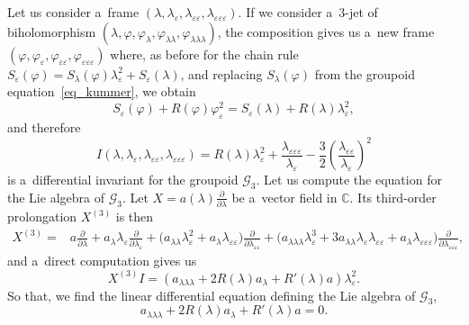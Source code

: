 \documentclass[pdftex]{sigma}
\numberwithin{equation}{section}
\theoremstyle{definition}
\begin{document}
Let us consider a~frame $(\lambda,\lambda_\varepsilon,\lambda_{\varepsilon\varepsilon},\lambda_{\varepsilon\varepsilon\varepsilon})$. If we consider a~$3$-jet of biholomorphism $(\lambda,\varphi,\varphi_\lambda,\allowbreak \varphi_{\lambda\lambda},\varphi_{\lambda\lambda\lambda})$, the composition gives us a~new frame $(\varphi,\varphi_\varepsilon,\varphi_{\varepsilon\varepsilon},\varphi_{\varepsilon\varepsilon\varepsilon})$ where, as before for the chain rule
$
S_{\varepsilon}(\varphi) = S_{\lambda}(\varphi) \lambda_{\varepsilon}^2 + S_\varepsilon(\lambda)$,
and replacing $S_{\lambda}(\varphi)$ from the groupoid equation~\eqref{eq_kummer}, we obtain
\[
S_{\varepsilon}(\varphi) + R(\varphi)\varphi_\varepsilon^2 = S_{\varepsilon}(\lambda) + R(\lambda)\lambda_\varepsilon^2,
\]
and therefore
\begin{equation}\label{eq_invariant}
I(\lambda,\lambda_{\varepsilon},\lambda_{\varepsilon\varepsilon},\lambda_{\varepsilon\varepsilon\varepsilon}) = R(\lambda)\lambda_\varepsilon^2 + \frac{\lambda_{\varepsilon\varepsilon\varepsilon}}{\lambda_\varepsilon} - \frac{3}{2}
\left(\frac{\lambda_{\varepsilon\varepsilon}}{\lambda_\varepsilon}\right)^2
\end{equation}
is a~differential invariant for the groupoid $\mathcal G_3$. Let us compute the equation for the Lie algebra of $\mathcal G_3$. Let $X = a(\lambda)\frac{\partial}{\partial \lambda}$ be a~vector field in $\mathbb C$. Its third-order prolongation $X^{(3)}$ is then
\begin{align*}%
X^{(3)} ={} & a\frac{\partial}{\partial \lambda} + a_\lambda\lambda_\varepsilon\frac{\partial}{\partial \lambda_\varepsilon}+
\bigl(a_{\lambda\lambda} \lambda_\varepsilon^2 + a_\lambda \lambda_{\varepsilon\varepsilon}\bigr)\frac{\partial}{\partial \lambda_{\varepsilon\varepsilon}}
+ \bigl(a_{\lambda\lambda\lambda}\lambda_\varepsilon^3 + 3a_{\lambda\lambda}\lambda_\varepsilon\lambda_{\varepsilon\varepsilon}
+ a_\lambda\lambda_{\varepsilon\varepsilon\varepsilon} \bigr) \frac{\partial}{\partial \lambda_{\varepsilon\varepsilon\varepsilon}},
\end{align*}
and a~direct computation gives us
\[
X^{(3)}I = (a_{\lambda\lambda\lambda} + 2R(\lambda) a_{\lambda} + R'(\lambda)a)\lambda_\varepsilon^2.
\]
So that, we find the linear differential equation defining the Lie algebra of $\mathcal G_3$,
\begin{equation}\label{eq_sym2}
 a_{\lambda\lambda\lambda} + 2R(\lambda)a_{\lambda} + R'(\lambda)a = 0.
\end{equation}
\end{document}
